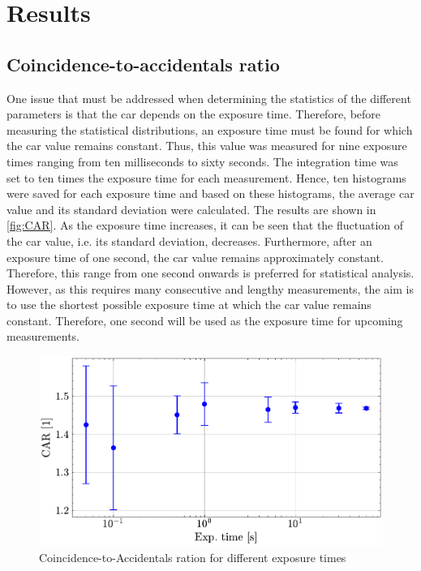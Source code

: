 \section{Results}

\subsection{Coincidence-to-accidentals ratio}
One issue that must be addressed when determining the statistics of the different parameters is that the \acrfull{car} depends on the exposure time. Therefore, before measuring the statistical distributions, an exposure time must be found for which the \acrshort{car} value remains constant. Thus, this value was measured for nine exposure times ranging from ten milliseconds to sixty seconds. The integration time was set to ten times the exposure time for each measurement. Hence, ten histograms were saved for each exposure time and based on these histograms, the average \acrshort{car} value and its standard deviation were calculated. \newline
The results are shown in \autoref{fig:CAR}. As the exposure time increases, it can be seen that the fluctuation of the \acrshort{car} value, i.e. its standard deviation, decreases. Furthermore, after an exposure time of one second, the \acrshort{car} value remains approximately constant. Therefore, this range from one second onwards is preferred for statistical analysis. However, as this requires many consecutive and lengthy measurements, the aim is to use the shortest possible exposure time at which the \acrshort{car} value remains constant. Therefore, one second will be used as the exposure time for upcoming measurements.
\begin{figure}[bt!]
	\centering
	\includegraphics[width=.9\textwidth]{Images/CAR_Ratio_2.pdf}
	\caption{Coincidence-to-Accidentals ration for different exposure times}
	\label{fig:CAR}
\end{figure}
